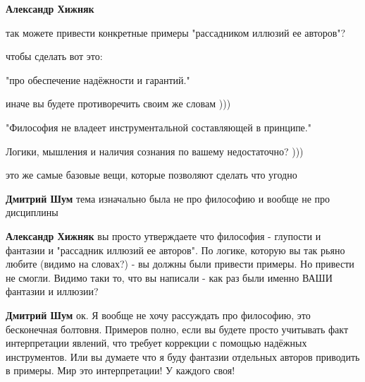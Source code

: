\begin{itemize}
\begin{itemize}
 
\textbf{Александр Хижняк}

так можете привести конкретные примеры "рассадником иллюзий ее авторов"?

чтобы сделать вот это:

"про обеспечение надёжности и гарантий."

иначе вы будете противоречить своим же словам )))

"Философия не владеет инструментальной составляющей в принципе."

Логики, мышления и наличия сознания по вашему недостаточно? )))

это же самые базовые вещи, которые позволяют сделать что угодно

 
\textbf{Дмитрий Шум} тема изначально была не про философию и вообще не про дисциплины

 
\textbf{Александр Хижняк} вы просто утверждаете что философия - глупости и
фантазии и "рассадник иллюзий ее авторов". По логике, которую вы так рьяно
любите (видимо на словах?) - вы должны были привести примеры. Но привести не
смогли. Видимо таки то, что вы написали - как раз были именно ВАШИ фантазии и
иллюзии?

 
\textbf{Дмитрий Шум} ок. Я вообще не хочу рассуждать про философию, это
бесконечная болтовня. Примеров полно, если вы будете просто учитывать факт
интерпретации явлений, что требует коррекции с помощью надёжных инструментов.
Или вы думаете что я буду фантазии отдельных авторов приводить в примеры. Мир
это интерпретации! У каждого своя!


\end{itemize}
\end{itemize}
